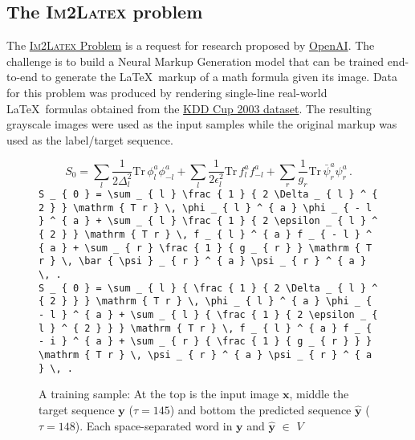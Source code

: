 \documentclass{article}
\begin{document}
\subsection{The \textsc{Im2Latex} problem}
\label{the_problem}
The \href{https://openai.com/requests-for-research/#im2latex}{\textsc{Im2Latex} Problem} is a request for research
proposed by \href{https://openai.com}{OpenAI}. The challenge is to build a Neural Markup
Generation model that can be trained end-to-end to generate the \LaTeX ~markup of a math formula given its image.
Data for this problem was produced by rendering single-line real-world \LaTeX  ~formulas obtained from the \href{http://www.cs.cornell.edu/projects/kddcup/datasets.html}{KDD Cup 2003 dataset}. The resulting grayscale images were used as the input samples while the original markup was used as the label/target sequence.
\lstset{basicstyle=\tiny}
\begin{figure}[!h]
	\begin{displaymath}
	S _ { 0 } = \sum _ { l } \frac { 1 } { 2 \Delta _ { l } ^ { 2 } } \mathrm { T r } \, \phi _ { l } ^ { a } \phi _ { - l } ^ { a } + \sum _ { l } \frac { 1 } { 2 \epsilon _ { l } ^ { 2 } } \mathrm { T r } \, f _ { l } ^ { a } f _ { - l } ^ { a } + \sum _ { r } \frac { 1 } { g _ { r } } \mathrm { T r } \, \bar { \psi } _ { r } ^ { a } \psi _ { r } ^ { a } \, .
	\end{displaymath}
	\lstinline|S _ { 0 } = \sum _ { l } \frac { 1 } { 2 \Delta _ { l } ^ { 2 } } \mathrm { T r } \, \phi _ { l } ^ { a } \phi _ { - l } ^ { a } + \sum _ { l } \frac { 1 } { 2 \epsilon _ { l } ^ { 2 } } \mathrm { T r } \, f _ { l } ^ { a } f _ { - l } ^ { a } + \sum _ { r } \frac { 1 } { g _ { r } } \mathrm { T r } \, \bar { \psi } _ { r } ^ { a } \psi _ { r } ^ { a } \, .| \\
		
	\lstinline|S _ { 0 } = \sum _ { l } { \frac { 1 } { 2 \Delta _ { l } ^ { 2 } } } \mathrm { T r } \, \phi _ { l } ^ { a } \phi _ { - l } ^ { a } + \sum _ { l } { \frac { 1 } { 2 \epsilon _ { l } ^ { 2 } } } \mathrm { T r } \, f _ { l } ^ { a } f _ { - i } ^ { a } + \sum _ { r } { \frac { 1 } { g _ { r } } } \mathrm { T r } \, \psi _ { r } ^ { a } \psi _ { r } ^ { a } \, .|
	\caption{A training sample: At the top is the input image $\boldsymbol{x}$, middle the target sequence $\boldsymbol{y}$ ($\tau = 145$) and bottom the predicted sequence $\boldsymbol{\hat{y}}$ (${\tau} = 148$). Each space-separated word in $\boldsymbol{y}$ and $\boldsymbol{\hat{y}}$ $\in$ $V$ }
	\label{fig-sample}
\end{figure}
\end{document}
